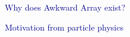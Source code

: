 \documentclass[aspectratio=169]{beamer}
\begin{document}

\begin{frame}{}
\Huge
\vspace{1 cm}
\begin{center}
\textcolor{darkblue}{Why does Awkward Array exist?}

\vspace{0.25 cm}
\textcolor{darkblue}{Motivation from particle physics}
\end{center}
\end{frame}
\end{document}
